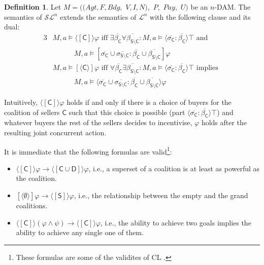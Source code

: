 \documentclass[letterpaper]{article} %
\theoremstyle{definition}
\newtheorem{definition}{Definition}
\newcommand{\Pay}{\mathit{Pay}}
\begin{document}
\begin{definition}
Let $M = ((Agt, F, Bdg,$ $V, I, N),$ $P,$ $\Pay,$ $U)$ be an $n$-DAM. The semantics of $\mathcal{SL}^n$ extends the semantics of $\mathcal{L}^n$ with the following clause and its dual:
    \begin{alignat*}{3}
        &M,a \models \langle \! [\mathsf{C}] \! \rangle \varphi \text{ iff } \exists \overline{\beta_\mathsf{C}}\forall \overline{\beta_{\mathsf{S \setminus C}}}: %
        M,a \models \langle \overline{\sigma_{\mathsf{C}}}: \overline{\beta_{\mathsf{C}}} \rangle \top \text{ and }\\ 
        & \qquad \quad %
        M,a \models [{\overline{\sigma_\mathsf{C}}\cup \overline{\sigma_{\mathsf{S \setminus C}}}:\overline{\beta_\mathsf{C}}\cup \overline{\beta_{\mathsf{S \setminus C}}}} ] \varphi\\
        &M,a \models [ \! \langle\mathsf{C}\rangle \! ] \varphi \text{ iff } \forall \overline{\beta_\mathsf{C}}\exists \overline{\beta_{\mathsf{S \setminus C}}}: %
        M,a \models \langle \overline{\sigma_{\mathsf{C}}}: \overline{\beta_{\mathsf{C}}} \rangle \top \text{ implies }\\ 
        & \qquad \quad M,a \models \langle {\overline{\sigma_\mathsf{C}}\cup \overline{\sigma_{\mathsf{S \setminus C}}}:\overline{\beta_\mathsf{C}}\cup \overline{\beta_{\mathsf{S \setminus C}}}} \rangle \varphi
\end{alignat*}     
\end{definition}

Intuitively, $\langle \! [\mathsf{C}] \! \rangle \varphi$ holds if and only if there is a choice of buyers for the coalition of sellers $\mathsf{C}$ such that this choice is possible (part $\langle \overline{\sigma_{\mathsf{C}}}: \overline{\beta_{\mathsf{C}}} \rangle \top$) and whatever buyers the rest of the sellers decides to incentivise, $\varphi$ holds after the resulting joint concurrent action. 

It is immediate %
that the following formulas are valid\footnote{These formulas are some of the validites of CL \cite{pauly02}.}:
\begin{itemize}
    \item $\langle \! [\mathsf{C}] \! \rangle \varphi \to \langle \! [\mathsf{C} \cup \mathsf{D}] \! \rangle \varphi$, i.e., a superset of a coalition is at least as powerful as the coalition.
    \item $[ \! \langle\mathsf{\emptyset}\rangle \! ] \varphi \to \langle \! [\mathsf{S}] \! \rangle \varphi$, i.e., the relationship between the empty and the grand coalitions.
    \item $\langle \! [\mathsf{C}] \! \rangle (\varphi \land \psi) \to \langle \! [\mathsf{C}] \! \rangle \varphi$, i.e., the ability to achieve two goals implies the ability to achieve any single one of them.
\end{itemize}
\end{document}
